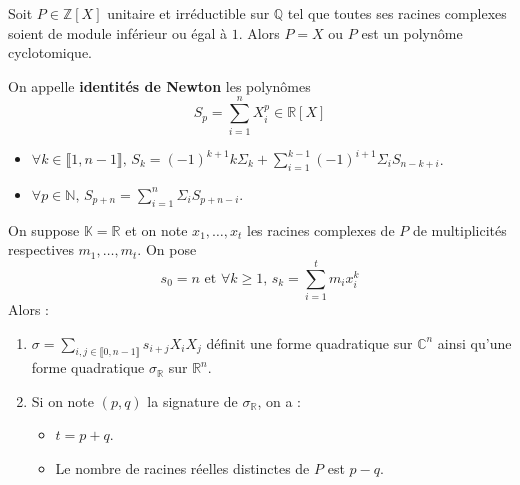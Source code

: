   \begin{corollary}
    Soit $P \in \mathbb{Z}[X]$ unitaire et irréductible sur $\mathbb{Q}$ tel que toutes ses racines complexes soient de module inférieur ou égal à $1$. Alors $P = X$ ou $P$ est un polynôme cyclotomique.
  \end{corollary}


  \begin{definition}
    On appelle \textbf{identités de Newton} les polynômes
    \[ S_p = \sum_{i=1}^n X_i^p \in \mathbb{R}[X] \]
  \end{definition}

  \begin{proposition}
    \begin{itemize}
      \item $\forall k \in \llbracket 1, n-1 \rrbracket, \, S_k = (-1)^{k+1} k \Sigma_k + \sum_{i=1}^{k-1} (-1)^{i+1} \Sigma_i S_{n-k+i}$.
      \item $\forall p \in \mathbb{N}, \, S_{p+n} = \sum_{i=1}^n \Sigma_i S_{p+n-i}$.
    \end{itemize}
  \end{proposition}


  \begin{application}
    On suppose $\mathbb{K} = \mathbb{R}$ et on note $x_1, \dots, x_t$ les racines complexes de $P$ de multiplicités respectives $m_1, \dots, m_t$. On pose
    \[ s_0 = n \text{ et } \forall k \geq 1, \, s_k = \sum_{i=1}^t m_i x_i^k \]
    Alors :
    \begin{enumerate}[label={\bfseries(\roman*)}]
      \item $\sigma = \sum_{i, j \in \llbracket 0, n-1 \rrbracket} s_{i+j} X_i X_j$ définit une forme quadratique sur $\mathbb{C}^n$ ainsi qu'une forme quadratique $\sigma_{\mathbb{R}}$ sur $\mathbb{R}^n$.
      \item Si on note $(p,q)$ la signature de $\sigma_{\mathbb{R}}$, on a :
      \begin{itemize}
        \item $t = p + q$.
        \item Le nombre de racines réelles distinctes de $P$ est $p-q$.
      \end{itemize}
    \end{enumerate}
  \end{application}

